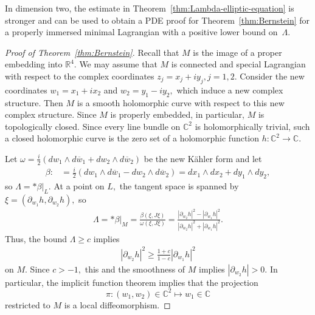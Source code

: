 \documentclass[11pt]{amsart}
\numberwithin{equation}{section}
\theoremstyle{definition}
\theoremstyle{definition}
\newcommand{\ovl}[1]{\overline{#1}}
\newcommand{\pr}[1]{\left(#1\right)}
\newcommand{\bb}[1]{\mathbb{#1}} \newcommand{\td}[1]{\widetilde{#1}}
\newcommand{\bd}{\partial}
\begin{document}
In dimension two, the estimate in Theorem~\ref{thm:Lambda-elliptic-equation} is stronger and can be used to obtain a PDE proof for Theorem~\ref{thm:Bernstein} for a properly immersed minimal Lagrangian with a positive lower bound on~$\Lambda.$


\begin{proof}
[Proof of Theorem~\ref{thm:Bernstein}]
    Recall that $M$ is the image of a proper embedding into $\mathbb{R}^4$.
    We may assume that $M$ is connected and special Lagrangian with respect to the complex coordinates $z_j=x_j+iy_j, j=1, 2$.
    Consider the new coordinates $w_1=x_1+ix_2$ and $w_2=y_1-iy_2,$
    which induce a new complex structure.
    Then $M$ is a smooth holomorphic curve with respect to this new complex structure.
    Since $M$ is properly embedded, in particular, $M$ is topologically closed. 
    Since every line bundle on $\bb C^2$ is holomorphically  trivial, such a closed holomorphic curve is the zero set of a holomorphic function $h\colon \bb C^2\to\bb C.$
    
    Let
    $\omega = \frac i2 \pr{dw_1\wedge d\ovl w_1 + dw_2\wedge d\ovl w_2}$
    be the new K\"ahler form and let 
    \begin{align*}
    \beta
    :& = \frac i2 \pr{dw_1\wedge d\ovl w_1 - dw_2\wedge d\ovl w_2}
    = dx_1\wedge dx_2 + dy_1\wedge dy_2,
    \end{align*}
    so $\Lambda = *\beta|_L.$
    At a point on $L,$ the tangent space is spanned by $\xi=(\bd_{w_1}h, \bd_{w_2}h),$ so
    \begin{align*}
    \Lambda
    = *\beta|_M
    = \frac{\beta\pr{\xi, J\xi}}{\omega(\xi,J\xi)}
    = \frac{|\bd_{w_2}h|^2-|\bd_{w_1}h|^2} {|\bd_{w_2}h|^2+|\bd_{w_1}h|^2}.
    \end{align*}
    Thus, the bound $\Lambda\ge c$ implies
    \begin{align}\label{L-w-2-dom}
    |\bd_{w_2}h|^2 \ge \frac{1+c}{1-c}|\bd_{w_1}h|^2
    \end{align} 
    on $M.$ 
    Since $c>-1,$ this and the smoothness of $M$ implies $|\bd_{w_2}h|>0.$
    In particular, the implicit function theorem implies that the projection 
    $$\pi\colon (w_1,w_2)\in\bb C^2\mapsto w_1\in\bb C$$ 
    restricted to $M$ is a local diffeomorphism.


\end{proof}
\end{document}
